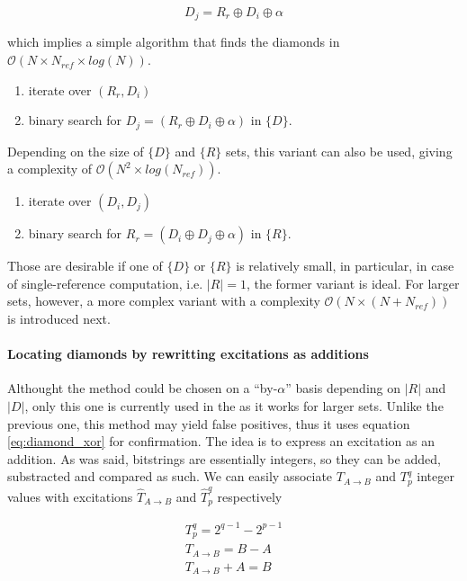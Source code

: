 \documentclass[./thesis.tex]{subfiles}
\begin{document}
\begin{equation}
D_j = R_r \oplus D_i \oplus \alpha
\end{equation}

which implies a simple algorithm that finds the diamonds in $\mathcal{O}(N \times N_{ref} \times log(N))$.
\begin{enumerate}
\item
iterate over $(R_r, D_i)$
\item
binary search for $D_j = (R_r \oplus D_i \oplus \alpha)$ in $\{D\}$. 
\end{enumerate}

Depending on the size of $\{D\}$ and $\{R\}$ sets, this variant can also be used, giving a complexity of $\mathcal{O}(N^2 \times log(N_{ref}))$.

\begin{enumerate}
\item
iterate over $(D_i, D_j)$
\item
binary search for $R_r = (D_i \oplus D_j \oplus \alpha)$ in $\{R\}$. 
\end{enumerate}

Those are desirable if one of $\{D\}$ or $\{R\}$ is relatively small, in particular, in case of single-reference computation, i.e. $|R|=1$, the former variant is ideal. For larger sets, however, a more complex variant with a complexity $\mathcal{O}(N \times (N+N_{ref}))$ is introduced next.


\paragraph{Locating diamonds by rewritting excitations as additions}
Althought the method could be chosen on a ``by-$\alpha$'' basis depending on $|R|$ and $|D|$, only this one is currently used in the \QP as it works for larger sets.
Unlike the previous one, this method may yield false positives, thus it uses equation \ref{eq:diamond_xor} for confirmation.
The idea is to express an excitation as an addition. As was said, bitstrings are essentially integers, so they can be added, substracted and compared as such. We can easily associate $T_{A \rightarrow B}$ and $T_p^q$ integer values with  excitations $\hat T_{A \rightarrow B}$ and $\hat T_p^q$ respectively

\begin{align}
T_p^q = 2^{q-1} - 2^{p-1} \\
T_{A \rightarrow B} = B - A \\
T_{A \rightarrow B} + A = B 
\end{align}
\end{document}
